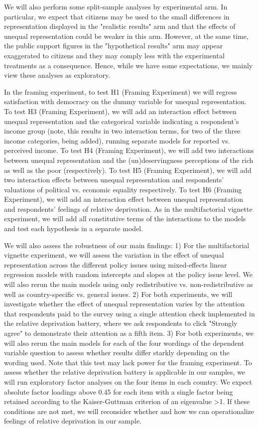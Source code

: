 \documentclass[12pt, letterpaper]{article}
\begin{document}
\begin{spacing}{1.5}
We will also perform some split-sample analyses by experimental arm. In particular, we expect that citizens may be used to the small differences in representation displayed in the "realistic results" arm and that the effects of unequal representation could be weaker in this arm. However, at the same time, the public support figures in the "hypothetical results" arm may appear exaggerated to citizens and they may comply less with the experimental treatments as a consequence. Hence, while we have some expectations, we mainly view these analyses as exploratory.

In the framing experiment, to test H1 (Framing Experiment) we will regress satisfaction with democracy on the dummy variable for unequal representation. To test H3 (Framing Experiment), we will add an interaction effect between unequal representation and the categorical variable indicating a respondent's income group (note, this results in two interaction terms, for two of the three income categories, being added), running separate models for reported vs. perceived income. To test H4 (Framing Experiment), we will add two interactions between unequal representation and the (un)deservingness perceptions of the rich as well as the poor (respectively). To test H5 (Framing Experiment), we will add two interaction effects between unequal representation and respondents' valuations of political vs. economic equality respectively. To test H6 (Framing Experiment), we will add an interaction effect between unequal representation and respondents' feelings of relative deprivation. As in the multifactorial vignette experiment, we will add all constitutive terms of the interactions to the models and test each hypothesis in a separate model.

We will also assess the robustness of our main findings: 1) For the multifactorial vignette experiment, we will assess the variation in the effect of unequal representation across the different policy issues using mixed-effects linear regression models with random intercepts and slopes at the policy issue level. We will also rerun the main models using only redistributive vs. non-redistributive as well as country-specific vs. general issues. 2) For both experiments, we will investigate whether the effect of unequal representation varies by the attention that respondents paid to the survey using a single attention check implemented in the relative deprivation battery, where we ask respondents to click "Strongly agree" to demonstrate their attention as a fifth item. 3) For both experiments, we will also rerun the main models for each of the four wordings of the dependent variable question to assess whether results differ starkly depending on the wording used. Note that this test may lack power for the framing experiment.
To assess whether the relative deprivation battery is applicable in our samples, we will run exploratory factor analyses on the four items in each country. We expect absolute factor loadings above 0.45 for each item with a single factor being retained according to the Kaiser-Guttman criterion of an eigenvalue >1. If these conditions are not met, we will reconsider whether and how we can operationalize feelings of relative deprivation in our sample.





\end{spacing}
\end{document}
